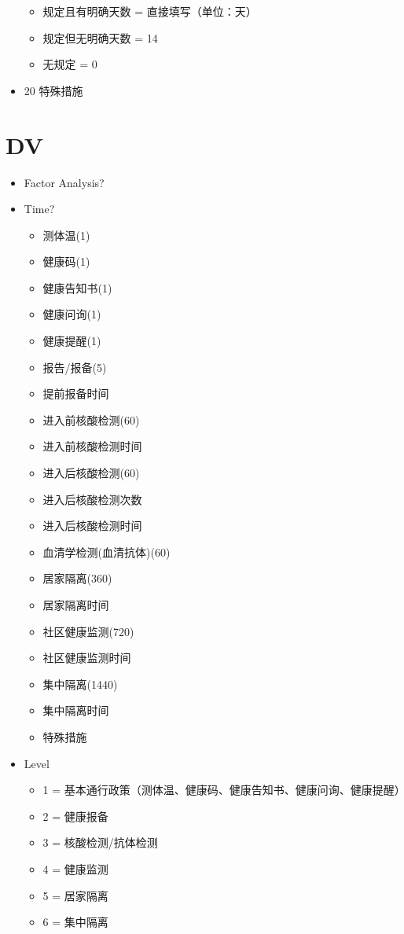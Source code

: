 \documentclass[
  12pt,
]{ctexart}
\providecommand{\tightlist}{%
  \setlength{\itemsep}{0pt}\setlength{\parskip}{0pt}}
\begin{document}
\begin{itemize}
  \begin{itemize}
  \tightlist
  \item
    规定且有明确天数 = 直接填写（单位：天）
  \item
    规定但无明确天数 = 14
  \item
    无规定 = 0
  \end{itemize}
\item
  20 特殊措施
\end{itemize}

\hypertarget{dv}{%
\section{DV}\label{dv}}

\begin{itemize}
\item
  Factor Analysis?
\item
  Time?

  \begin{itemize}
  \tightlist
  \item
    测体温(1)
  \item
    健康码(1)
  \item
    健康告知书(1)
  \item
    健康问询(1)
  \item
    健康提醒(1)
  \item
    报告/报备(5)
  \item
    提前报备时间
  \item
    进入前核酸检测(60)
  \item
    进入前核酸检测时间
  \item
    进入后核酸检测(60)
  \item
    进入后核酸检测次数
  \item
    进入后核酸检测时间
  \item
    血清学检测(血清抗体)(60)
  \item
    居家隔离(360)
  \item
    居家隔离时间
  \item
    社区健康监测(720)
  \item
    社区健康监测时间
  \item
    集中隔离(1440)
  \item
    集中隔离时间
  \item
    特殊措施
  \end{itemize}
\item
  Level

  \begin{itemize}
  \tightlist
  \item
    1 = 基本通行政策（测体温、健康码、健康告知书、健康问询、健康提醒）
  \item
    2 = 健康报备
  \item
    3 = 核酸检测/抗体检测
  \item
    4 = 健康监测
  \item
    5 = 居家隔离
  \item
    6 = 集中隔离
  \end{itemize}
\end{itemize}
\end{document}
